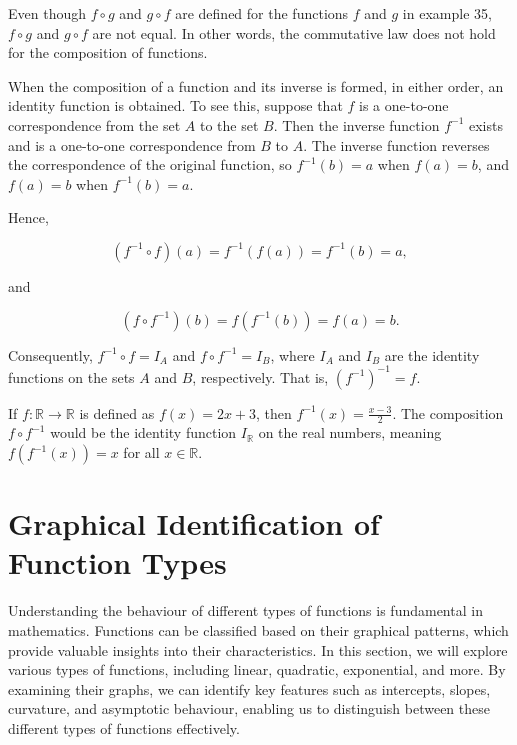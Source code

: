 \begin{remark}
Even though \( f \circ g \) and \( g \circ f \) are defined for the functions \( f \) and \( g \) in example 35, \( f \circ g \) and \( g \circ f \) are not equal. In other words, the commutative law does not hold for the composition of functions.
  
\end{remark}

When the composition of a function and its inverse is formed, in either order, an identity function is obtained. To see this, suppose that \( f \) is a one-to-one correspondence from the set \( A \) to the set \( B \). Then the inverse function \( f^{-1} \) exists and is a one-to-one correspondence from \( B \) to \( A \). The inverse function reverses the correspondence of the original function, so \( f^{-1}(b)=a \) when \( f(a)=b \), and \( f(a)=b \) when \( f^{-1}(b)=a \).

Hence,

\[
\left(f^{-1} \circ f\right)(a) = f^{-1}(f(a)) = f^{-1}(b) = a,
\]

and

\[
\left(f \circ f^{-1}\right)(b) = f\left(f^{-1}(b)\right) = f(a) = b.
\]

Consequently, \( f^{-1} \circ f = I_A \) and \( f \circ f^{-1} = I_B \), where \( I_A \) and \( I_B \) are the identity functions on the sets \( A \) and \( B \), respectively. That is, \( \left(f^{-1}\right)^{-1} = f \).

\begin{example}
    If $f: \mathbb{R} \rightarrow \mathbb{R}$ is defined as $f(x)=2 x+3$, then $f^{-1}(x)=\frac{x-3}{2}$. The composition $f \circ f^{-1}$ would be the identity function $I_{\mathbb{R}}$ on the real numbers, meaning $f\left(f^{-1}(x)\right)=x$ for all $x \in \mathbb{R}$.
\end{example}

\section{Graphical Identification of Function Types}
Understanding the behaviour of different types of functions is fundamental in mathematics. Functions can be classified based on their graphical patterns, which provide valuable insights into their characteristics. In this section, we will explore various types of functions, including linear, quadratic, exponential, and more. By examining their graphs, we can identify key features such as intercepts, slopes, curvature, and asymptotic behaviour, enabling us to distinguish between these different types of functions effectively.

